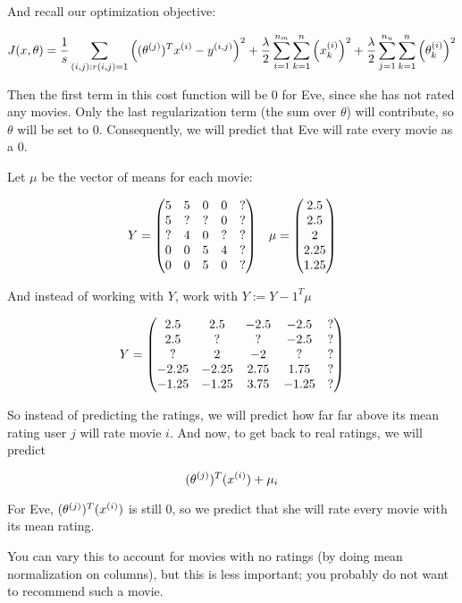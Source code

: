 And recall our optimization objective:

\[
    J( x, \theta ) = 
    \frac{1}{s} \sum_{(i,j) : r(i,j) = 1} \qty(
        (\theta_{}^{(j)})^T x_{}^{(i)} - y_{}^{(i,j)}
    )^2 +
    \frac{\lambda}{2} \sum_{i=1}^{n_m} \sum_{k=1}^n \qty( x_{k}^{(i)} )^2 + 
    \frac{\lambda}{2} \sum_{j=1}^{n_u} \sum_{k=1}^n \qty( \theta_{k}^{(i)} )^2
\]

Then the first term in this cost function will be 0 for Eve, since she has not rated any movies.
Only the last regularization term (the sum over $\theta$) will contribute, so $\theta$ will be set to 0.
Consequently, we will predict that Eve will rate every movie as a 0.

Let $\mu$ be the vector of means for each movie:

\[
    Y = \mqty(
        5 & 5 & 0 & 0 & ? \\
        5 & ? & ? & 0 & ? \\
        ? & 4 & 0 & ? & ? \\
        0 & 0 & 5 & 4 & ? \\
        0 & 0 & 5 & 0 & ?
    )
    \quad
    \mu = \mqty( 2.5 \\ 2.5 \\ 2 \\ 2.25 \\ 1.25 )
\]

And instead of working with $Y$, work with $Y := Y - 1^T \mu$

\[
    Y = \mqty(
        2.5 & 2.5 & -2.5 & -2.5 & ? \\
        2.5 & ? & ? & -2.5 & ? \\
        ? & 2 & -2 & ? & ? \\
        -2.25 & -2.25 & 2.75 & 1.75 & ? \\
        -1.25 & -1.25 & 3.75 & -1.25 & ?
    )
\]

So instead of predicting the ratings, we will predict how far far above its mean rating user $j$ will rate movie $i$.
And now, to get back to real ratings, we will predict

\[ (\theta_{}^{(j)})^T (x_{}^{(i)}) + \mu_i \]

For Eve, $(\theta_{}^{(j)})^T (x_{}^{(i)})$ is still 0, so we predict that she will rate every movie with its mean rating.

You can vary this to account for movies with no ratings (by doing mean normalization on columns),
but this is less important; you probably do not want to recommend such a movie.